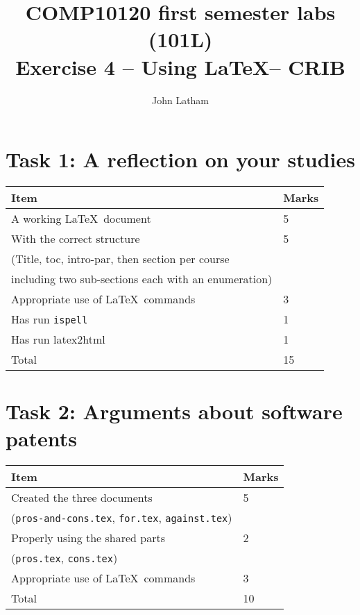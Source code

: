 \documentclass[12pt]{article}
\title{COMP10120 first semester labs (101L) \\
       Exercise 4 -- Using \LaTeX -- CRIB}
\author{John Latham}
\begin{document}
\maketitle

\section{Task 1: A reflection on your studies}

\begin{tabular}{|l|l|} \hline
Item & Marks \\ \hline
A working \LaTeX\ document & 5 \\ \hline
With the correct structure & 5 \\
(Title, toc, intro-par, then section per course & \\
including two sub-sections each with an enumeration) & \\ \hline
Appropriate use of \LaTeX\ commands & 3 \\ \hline
Has run \texttt{ispell} & 1 \\ \hline
Has run latex2html & 1 \\ \hline
\hline
Total & 15 \\ \hline
\end{tabular}

\section{Task 2: Arguments about software patents}

\begin{tabular}{|l|l|} \hline
Item & Marks \\ \hline
Created the three documents & 5 \\
(\texttt{pros-and-cons.tex}, \texttt{for.tex}, \texttt{against.tex}) & \\ \hline
Properly using the shared parts & 2 \\
(\texttt{pros.tex}, \texttt{cons.tex}) & \\ \hline
Appropriate use of \LaTeX\ commands & 3 \\ \hline
\hline
Total & 10 \\ \hline
\end{tabular}
\end{document}
